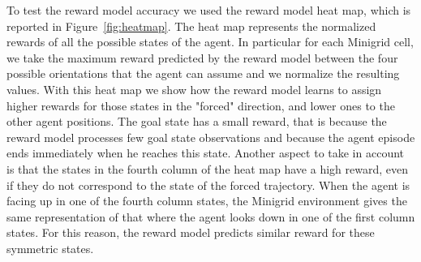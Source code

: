 To test the reward model accuracy we used the reward model heat map, which is reported in Figure\ \ref{fig:heatmap}. The heat map represents the normalized rewards of all the possible states of the agent. In particular for each Minigrid cell, we take the maximum reward predicted by the reward model between the four possible orientations that the agent can assume and we normalize the resulting values. 
With this heat map we show how the reward model learns to assign higher rewards for those states in the "forced" direction, and lower ones to the other agent positions. The goal state has a small reward, that is because the reward model processes few goal state observations and because the agent episode ends immediately when he reaches this state. Another aspect to take in account is that the states in the fourth column of the heat map have a high reward, even if they do not correspond to the state of the forced trajectory. When the agent is facing up in one of the fourth column states, the Minigrid environment gives the same representation of that where the agent looks down in one of the first column states. For this reason, the reward model predicts similar reward for these symmetric states. 


